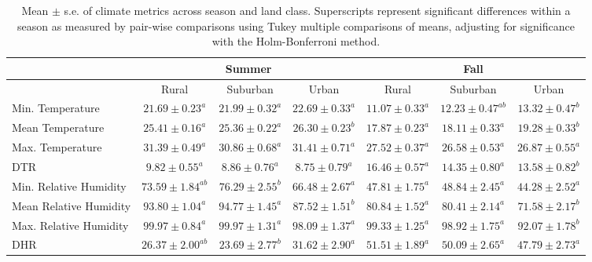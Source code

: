 \documentclass[12pt]{article}
\begin{document}
\newpage




\begin{landscape}

\begin{table}[]
\centering
\caption{Mean $\pm$ s.e. of climate metrics across season and land class. Superscripts represent significant differences within a season as measured by pair-wise comparisons using Tukey multiple comparisons of means, adjusting for significance with the Holm-Bonferroni method.}
\label{Table:climate}
\begin{tabular}{l|ccc|ccc}
                       & \multicolumn{3}{c}{Summer}                            & \multicolumn{3}{c}{Fall}                              \\
\hline
                       & Rural            & Suburban        & Urban            & Rural            & Suburban         & Urban           \\
\hline
Min. Temperature       & $21.69 \pm 0.23^a$  & $21.99 \pm 0.32^a$ & $22.69 \pm 0.33^a$  & $11.07 \pm 0.33^a$  & $12.23 \pm 0.47^{ab}$ & $13.32 \pm 0.47^b$ \\
Mean Temperature       & $25.41 \pm 0.16^a$  & $25.36 \pm 0.22^a$ & $26.30 \pm 0.23^b$  & $17.87 \pm 0.23^a$  & $18.11 \pm 0.33^a$  & $19.28 \pm 0.33^b$ \\
Max. Temperature       & $31.39 \pm 0.49^a$  & $30.86 \pm 0.68^a$ & $31.41 \pm 0.71^a$  & $27.52 \pm 0.37^a$  & $26.58 \pm 0.53^a$  & $26.87 \pm 0.55^a$ \\
DTR                    & $9.82 \pm 0.55^a$   & $8.86 \pm 0.76^a$  & $8.75 \pm 0.79^a$   & $16.46 \pm 0.57^a$  & $14.35 \pm 0.80^a$  & $13.58 \pm 0.82^b$ \\
Min. Relative Humidity & $73.59 \pm 1.84^{ab}$ & $76.29 \pm 2.55^b$ & $66.48 \pm 2.67^a$  & $47.81 \pm 1.75^a$  & $48.84 \pm 2.45^a$  & $44.28 \pm 2.52^a$ \\
Mean Relative Humidity & $93.80 \pm 1.04^a$ & $94.77 \pm 1.45^a$ & $87.52 \pm 1.51^b$ & $80.84  \pm 1.52^a$ & $80.41 \pm 2.14^a$  & $71.58 \pm 2.17^b$ \\
Max. Relative Humidity & $99.97 \pm 0.84^a$  & $99.97 \pm 1.31^a$ & $98.09 \pm 1.37^a$  & $99.33 \pm 1.25^a$  & $98.92 \pm 1.75^a$  & $92.07 \pm 1.78^b$ \\
DHR                    & $26.37 \pm 2.00^{ab}$ & $23.69 \pm 2.77^b$ & $31.62 \pm 2.90^a$  & $51.51 \pm 1.89^a$  & $50.09 \pm 2.65^a$  & $47.79 \pm 2.73^a$
\end{tabular}
\end{table}


\end{landscape}
\end{document}
